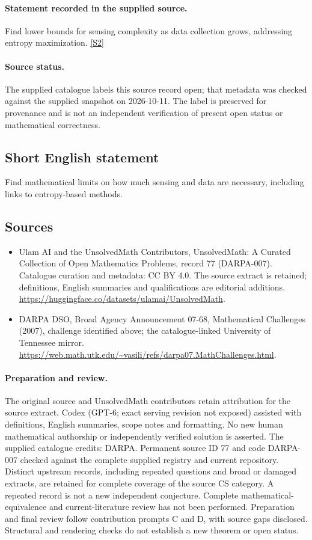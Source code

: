 \documentclass[11pt]{article}
\begin{document}
\paragraph{Statement recorded in the supplied source.}
Find lower bounds for sensing complexity as data collection grows, addressing entropy maximization. \href{https://web.math.utk.edu/~vasili/refs/darpa07.MathChallenges.html}{[S2]}
\paragraph{Source status.}
The supplied catalogue labels this source record open; that metadata was checked against the supplied snapshot on 2026-10-11. The label is preserved for provenance and is not an independent verification of present open status or mathematical correctness.
\subsection{Short English statement}
Find mathematical limits on how much sensing and data are necessary, including links to entropy-based methods.
\subsection{Sources}
\begin{itemize}
\item[S1] Ulam AI and the UnsolvedMath Contributors, UnsolvedMath: A Curated Collection of Open Mathematics Problems, record 77 (DARPA-007). Catalogue curation and metadata: CC BY 4.0. The source extract is retained; definitions, English summaries and qualifications are editorial additions.
\url{https://huggingface.co/datasets/ulamai/UnsolvedMath}.
\item[S2] DARPA DSO, Broad Agency Announcement 07-68, Mathematical Challenges (2007), challenge identified above; the catalogue-linked University of Tennessee mirror.
\url{https://web.math.utk.edu/~vasili/refs/darpa07.MathChallenges.html}.
\end{itemize}
\paragraph{Preparation and review.}
The original source and UnsolvedMath contributors retain attribution for the source extract. Codex (GPT-6; exact serving revision not exposed) assisted with definitions, English summaries, scope notes and formatting. No new human mathematical authorship or independently verified solution is asserted. The supplied catalogue credits: DARPA. Permanent source ID 77 and code DARPA-007 checked against the complete supplied registry and current repository. Distinct upstream records, including repeated questions and broad or damaged extracts, are retained for complete coverage of the source CS category. A repeated record is not a new independent conjecture. Complete mathematical-equivalence and current-literature review has not been performed. Preparation and final review follow contribution prompts C and D, with source gaps disclosed. Structural and rendering checks do not establish a new theorem or open status.
\label{end:77}
\end{document}
